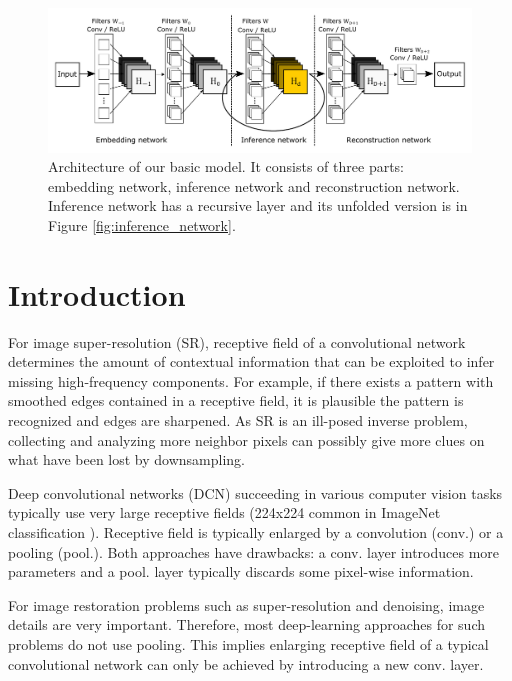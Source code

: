 \documentclass[10pt,twocolumn,letterpaper]{article}
\begin{document}
\begin{figure}[t]
	\includegraphics[width=\textwidth]{figs/f1}
	\caption {Architecture of our basic model. It consists of three parts: embedding network, inference network and reconstruction network. Inference network has a recursive layer and its unfolded version is in Figure \ref{fig:inference_network}.}
	\label{fig:overview}
\end{figure}


\section{Introduction}
For image super-resolution (SR), receptive field of a convolutional network determines the amount of contextual information that can be exploited to infer missing high-frequency components. For example, if there exists a pattern with smoothed edges contained in a receptive field, it is plausible the pattern is recognized and edges are sharpened. As SR is an ill-posed inverse problem, collecting and analyzing more neighbor pixels can possibly give more clues on what have been lost by downsampling. 

Deep convolutional networks (DCN) succeeding in various computer vision tasks typically use very large receptive fields  (224x224 common in ImageNet classification \cite{krizhevsky2012imagenet, simonyan2015very}). Receptive field is typically enlarged by a convolution (conv.) or a pooling (pool.).  Both approaches have drawbacks: a conv. layer introduces more parameters and a pool. layer typically discards some pixel-wise information. 


For image restoration problems such as super-resolution and denoising, image details are very important. Therefore, most deep-learning approaches for such problems do not use pooling. This implies enlarging receptive field of a typical convolutional network can only be achieved by introducing a new conv. layer.
\end{document}
